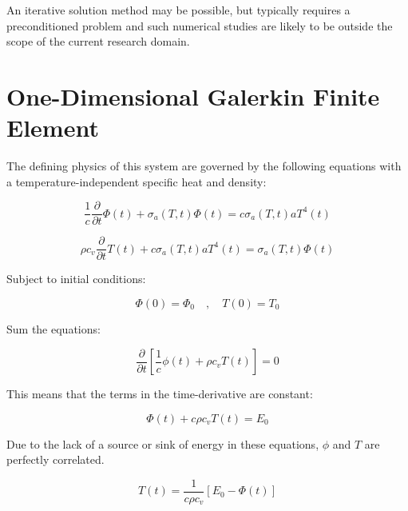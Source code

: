 \documentclass[12pt,a4paper,pagesize=pdftex]{scrartcl}
\begin{document}
An iterative solution method may be possible, but typically requires a preconditioned problem and such numerical studies are likely to be outside the scope of the current research domain.


\newpage
\section*{One-Dimensional Galerkin Finite Element}

The defining physics of this system are governed by the following equations with a temperature-independent specific heat and density:

\begin{equation*}
    \frac{1}{c} \frac{\partial}{\partial t} \Phi\left(t\right) + \sigma_a\left(T, t\right) \Phi\left(t\right) = c \sigma_a\left(T, t\right) a T^4\left(t\right)
\end{equation*}

\begin{equation*}
    \rho c_v \frac{\partial}{\partial t} T\left(t\right) + c \sigma_a \left(T, t\right) a T^4\left(t\right) = \sigma_a\left(T, t\right) \Phi\left(t\right)
\end{equation*}

Subject to initial conditions:

\begin{equation*}
    \Phi\left(0\right) = \Phi_0 \quad , \quad T\left(0\right) = T_0
\end{equation*}

Sum the equations:

\begin{equation*}
    \frac{\partial}{\partial t} \left[ \frac{1}{c} \phi\left(t\right) + \rho c_v T\left(t\right)\right] = 0
\end{equation*}

This means that the terms in the time-derivative are constant:

\begin{equation*}
    \Phi\left(t\right) + c \rho c_v T\left(t\right) = E_0
\end{equation*}

Due to the lack of a source or sink of energy in these equations, \(\phi\) and \(T\) are perfectly correlated.

\begin{equation*}
    T\left(t\right) = \frac{1}{c \rho c_v} \left[E_0 - \Phi\left(t\right)\right]
\end{equation*}
\end{document}
